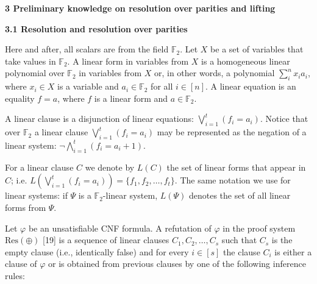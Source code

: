 \par\medskip\noindent\textbf{
3 Preliminary knowledge on resolution over parities and lifting}\par

\par\medskip\noindent\textbf{
3.1 Resolution and resolution over parities}\par


Here and after, all scalars are from the field $\mathbb{F}_{2}$. Let $X$ be a set of variables that take values in $\mathbb{F}_{2}$.
A linear form in variables from $X$ is a homogeneous linear polynomial over $\mathbb{F}_{2}$ in variables from $X$ or, in other words, a polynomial $\sum_{i}^{n}x_{i}a_{i}$, where $x_{i}\in X$ is a variable and $a_{i}\in\mathbb{F}_{2}$ for all $i\in[n]$. A linear equation is an equality $f=a$, where $f$ is a linear form and $a\in\mathbb{F}_{2}$.\par



A linear clause is a disjunction of linear equations: $\bigvee_{i=1}^{t}(f_{i}=a_{i})$.
Notice that over $\mathbb{F}_{2}$ a linear clause $\bigvee_{i=1}^{t}(f_{i}=a_{i})$ may be represented as the negation of a linear system: $\lnot\bigwedge_{i=1}^{t}(f_{i}=a_{i}+1)$.\par



For a linear clause $C$ we denote by $L(C)$ the set of linear forms that appear in $C$; i.e. $L\left(\bigvee_{i=1}^{t}(f_{i}=a_{i})\right)=\{f_{1},f_{2},\dots,f_{t}\}$. The same notation we use for linear systems: if $\Psi$ is a $\mathbb{F}_{2}$-linear system, $L(\Psi)$ denotes the set of all linear forms from $\Psi$.\par



Let $\varphi$ be an unsatisfiable CNF formula.
A refutation of $\varphi$ in the proof system $\mathrm{Res}(\oplus)$ [19] is a sequence of linear clauses $C_{1},C_{2},\dots,C_{s}$ such that $C_{s}$ is the empty clause (i.e., identically false) and for every $i\in[s]$ the clause $C_{i}$ is either a clause of $\varphi$ or is obtained from previous clauses by one of the following inference rules:\par


